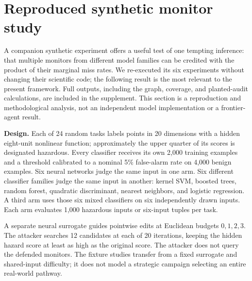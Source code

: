 \documentclass[10pt,twocolumn,letterpaper]{article}
\newcommand{\para}[1]{\smallskip\noindent\textbf{#1}\enspace}
\begin{document}
\section{Reproduced synthetic monitor study}
\label{sec:monitors}

A companion synthetic experiment offers a useful test of one tempting inference: that multiple monitors from different model families can be credited with the product of their marginal miss rates. We re-executed its six experiments without changing their scientific code; the following result is the most relevant to the present framework. Full outputs, including the graph, coverage, and planted-audit calculations, are included in the supplement. This section is a reproduction and methodological analysis, not an independent model implementation or a frontier-agent result.

\para{Design.} Each of 24 random tasks labels points in 20 dimensions with a hidden eight-unit nonlinear function; approximately the upper quarter of its scores is designated hazardous. Every classifier receives its own 2,000 training examples and a threshold calibrated to a nominal 5\% false-alarm rate on 4,000 benign examples. Six neural networks judge the same input in one arm. Six different classifier families judge the same input in another: kernel SVM, boosted trees, random forest, quadratic discriminant, nearest neighbors, and logistic regression. A third arm uses those six mixed classifiers on six independently drawn inputs. Each arm evaluates 1,000 hazardous inputs or six-input tuples per task.

A separate neural surrogate guides pointwise edits at Euclidean budgets $0,1,2,3$. The attacker searches 12 candidates at each of 20 iterations, keeping the hidden hazard score at least as high as the original score. The attacker does not query the defended monitors. The fixture studies transfer from a fixed surrogate and shared-input difficulty; it does not model a strategic campaign selecting an entire real-world pathway.
\end{document}
